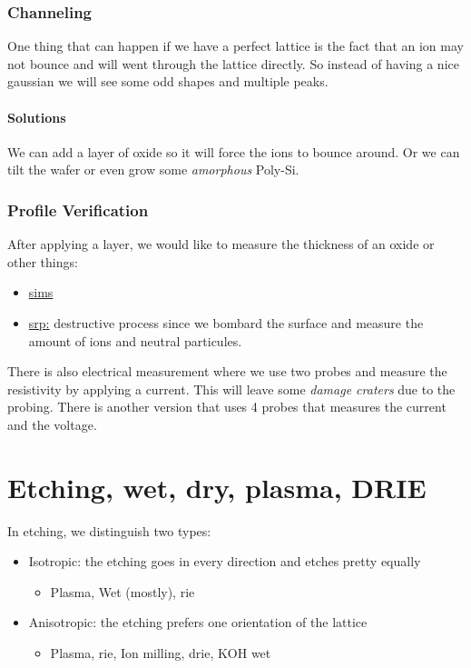 \documentclass{report}
\begin{document}
\subsection{Channeling}

One thing that can happen if we have a perfect lattice is the fact that an ion may not bounce and will went through the lattice directly. So instead of having a nice gaussian we will see some odd shapes and multiple peaks.

\subsubsection{Solutions}

We can add a layer of oxide so it will force the ions to bounce around. Or we can tilt the wafer or even grow some \textit{amorphous} Poly-Si.

\subsection{Profile Verification}

After applying a layer, we would like to measure the thickness of an oxide or other things:

\begin{itemize}
    \item \underline{\gls{sims}}
    \item \underline{\gls{srp}:} destructive process since we bombard the surface and measure the amount of ions and neutral particules.
\end{itemize}

There is also electrical measurement where we use two probes and measure the resistivity by applying a current. This will leave some \textit{damage craters} due to the probing. There is another version that uses 4 probes that measures the current and the voltage.





\chapter{Etching, wet, dry, plasma, DRIE}

In etching, we distinguish two types:

\begin{itemize}
    \item Isotropic: the etching goes in every direction and etches pretty equally
    \begin{itemize}
        \item Plasma, Wet (mostly), \gls{rie}
    \end{itemize}
    \item Anisotropic: the etching prefers one orientation of the lattice
    \begin{itemize}
        \item Plasma, \gls{rie}, Ion milling, \gls{drie}, KOH wet
    \end{itemize}
\end{itemize}
\end{document}
